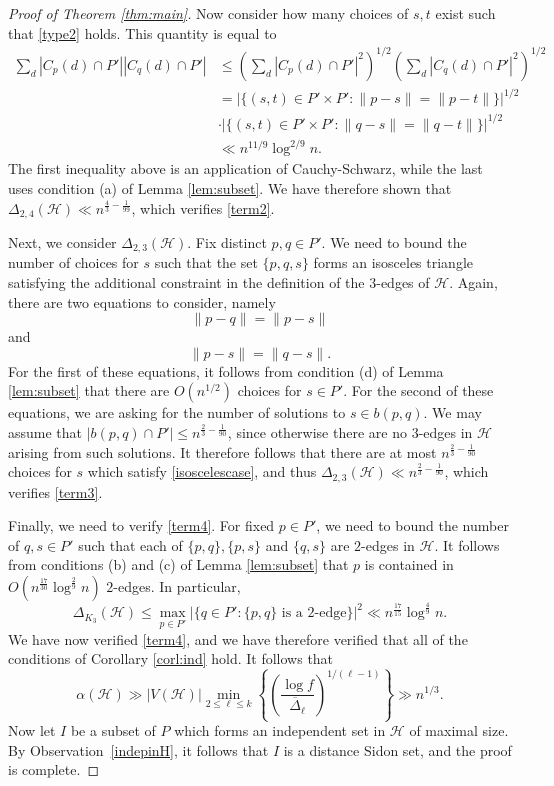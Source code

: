 \documentclass[11pt,oneside]{amsart}
\newcommand{\cH}{\mathcal{H}}
\numberwithin{exercise}{subsection}
\begin{document}
\begin{proof}[Proof of Theorem \ref{thm:main}]
Now consider how many choices of $s,t$ exist such that \eqref{type2} holds. This quantity is equal to
\begin{align*}
\sum_d |C_p(d) \cap P'| |C_q(d) \cap P'| &\leq \left ( \sum_d |C_p(d) \cap P'|^2 \right)^{1/2} \left ( \sum_d |C_q(d) \cap P'|^2 \right)^{1/2}
\\& = | \{ (s,t) \in P' \times P' : \|p-s\|=\|p-t\|\}|^{1/2}
\\& \cdot|\{ (s,t) \in P' \times P' : \|q-s\|=\|q-t\|\}|^{1/2}
\\& \ll n^{11/9} \log^{2/9}n.
\end{align*}
The first inequality above is an application of Cauchy-Schwarz, while the last uses condition (a) of Lemma \ref{lem:subset}. We have therefore shown that $\Delta_{2,4}(\mathcal{H}) \ll n^{\frac{4}{3}- \frac{1}{99}}$, which verifies \eqref{term2}.

Next, we consider $\Delta_{2,3}(\cH)$. Fix distinct $p,q \in P'$. We need to bound the number of choices for $s$ such that the set $ \{p,q,s\}$ forms an isosceles triangle satisfying the additional constraint in the definition of the $3$-edges of $\cH$. Again, there are two equations to consider, namely
\[
\|p-q\|=\|p-s\|
\]
and
\begin{equation} \label{isoscelescase}
\|p-s\|=\|q-s\|.
\end{equation}
For the first of these equations, it follows from condition (d) of Lemma \ref{lem:subset} that there are $O(n^{1/2})$ choices for $s \in P'$. For the second of these equations, we are asking for the number of solutions to $s \in b(p,q)$. We may assume that $|b(p,q) \cap P'| \leq n^{\frac{2}{3}-\frac{1}{90}}$, since otherwise there are no $3$-edges in $\cH$ arising from such solutions. It therefore follows that there are at most $n^{\frac{2}{3}-\frac{1}{90}}$ choices for $s$ which satisfy \eqref{isoscelescase}, and thus $\Delta_{2,3}(\cH) \ll n^{\frac{2}{3}-\frac{1}{90}}$, which verifies \eqref{term3}.

Finally, we need to verify \eqref{term4}. For fixed $p \in P'$, we need to bound the number of $q,s \in P'$ such that each of $\{p,q\}, \{p,s\}$ and $\{q,s \}$ are $2$-edges in $\cH$. It follows from conditions (b) and (c) of Lemma \ref{lem:subset} that $p$ is contained in $O(n^{\frac{17}{30}} \log^\frac{2}{9}n)$ $2$-edges. In particular,
\[
\Delta_{K_3}(\cH) \leq \max_{p \in P'} |\{ q \in P' : \{p,q \} \text{ is a $2$-edge}\}|^2  \ll n^{\frac{17}{15}} \log^{\frac{4}{9}} n.
\]
We have now verified \eqref{term4}, and we have therefore verified that all of the conditions of Corollary \ref{corl:ind} hold. It follows that
\[
\alpha(\mathcal{H})
\gg
|V(\mathcal{H})|
\min_{2 \leq \ell \leq k}
\left\{
\left(
\frac{\log f}{\overline{\Delta}_\ell}
\right)^{1/(\ell - 1)}
\right\}
\gg
n^{1/3}.
\]
Now let $I$ be a subset of $P$ which forms an independent set in $\mathcal{H}$ of maximal size. By Observation~\ref{indepinH}, it follows that $I$ is a distance Sidon set, and the proof is complete.
\end{proof}
\end{document}

